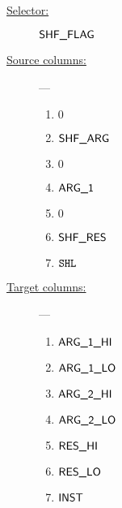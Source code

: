 \begin{description}
	\item[\underline{Selector:}] $\textsf{SHF\_FLAG}$
	\item[\underline{Source columns:}] ---
		\begin{multicols}{4}
			\begin{enumerate}
				\item $0$
				\item $\textsf{SHF\_ARG}$
				\item $0$
				\item $\textsf{ARG}\textsf{\_1}$
				\item $0$
				\item $\textsf{SHF\_RES}$
				\item $\texttt{SHL}$
			\end{enumerate}
		\end{multicols}
	\item[\underline{Target columns:}] ---
		\begin{multicols}{4}
		\begin{enumerate}
			\item $\textsf{ARG}\textsf{\_1}\textsf{\_HI}$
			\item $\textsf{ARG}\textsf{\_1}\textsf{\_LO}$
			\item $\textsf{ARG}\textsf{\_2}\textsf{\_HI}$
			\item $\textsf{ARG}\textsf{\_2}\textsf{\_LO}$
			\item $\textsf{RES}\textsf{\_HI}$
			\item $\textsf{RES}\textsf{\_LO}$
			\item $\textsf{INST}$
		\end{enumerate}
		\end{multicols}
\end{description}